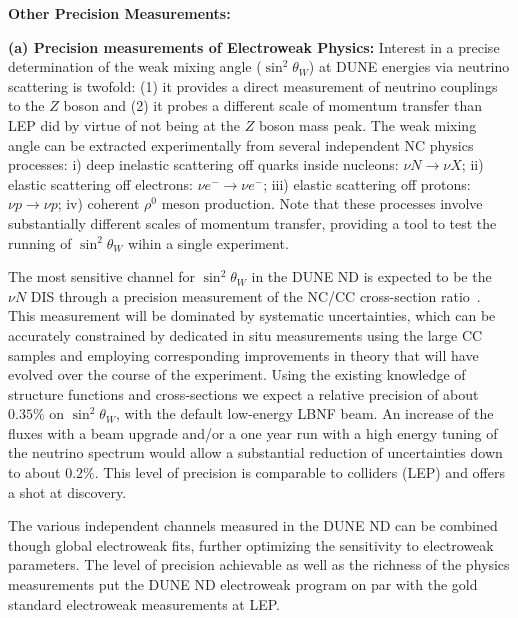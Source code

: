 \vspace{0.25cm} 
\noindent 
{\bf Other Precision Measurements:}

\vspace{0.25cm} 
\noindent 
{\bf (a) Precision measurements of  Electroweak Physics:} 
Interest in a precise determination of the weak mixing angle ($\sin^2 \theta_W$) at DUNE 
energies via neutrino scattering is twofold: (1) it provides a direct measurement of neutrino couplings to 
the $Z$ boson and (2) it probes a different scale of momentum transfer than LEP did by virtue
of not being at the $Z$ boson mass peak. 
% 
The weak mixing angle can be extracted experimentally from several independent NC physics processes:
i) deep inelastic scattering off quarks inside nucleons: $\nu N \to \nu X$; ii) elastic scattering off electrons: $\nu e^- \to \nu e^-$; 
iii) elastic scattering off protons: $\nu p \to \nu p$; iv) coherent $\rho^0$ meson production. 
Note that these processes involve
substantially different scales of momentum transfer, providing a tool
to test the running of $\sin^2 \theta_W$ wihin a single experiment. 

\vspace{0.25cm} 
\noindent 
The most sensitive channel for $\sin^2 \theta_W$ 
in the DUNE ND is expected to be the $\nu N$ DIS through a precision measurement 
of the NC/CC cross-section ratio~\cite{ND-EW}. This measurement will be dominated by systematic uncertainties, which can be 
accurately constrained by dedicated in situ measurements using the large CC samples and employing corresponding 
improvements in theory that will have evolved over the course of the experiment. Using the existing knowledge of 
structure functions and cross-sections we expect a relative precision of about $0.35\%$ on $\sin^2 \theta_W$, with 
the default low-energy LBNF beam. An increase of the fluxes with a beam upgrade and/or a one year run with a high 
energy tuning of the neutrino spectrum would allow a substantial reduction of uncertainties down to about $0.2\%$. 
This level of precision is comparable to colliders (LEP) and offers a shot at discovery.
 
\vspace{0.25cm} 
\noindent 
The various independent channels measured in the DUNE ND can be combined though global electroweak fits, 
further optimizing the sensitivity to electroweak parameters. The level of precision achievable as well as the richness of 
the physics measurements put the DUNE ND electroweak program on par with the gold standard electroweak measurements at LEP.   



